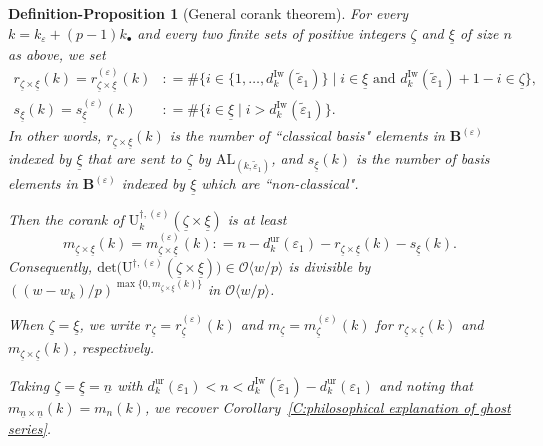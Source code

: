 \documentclass[12pt]{amsart}
\newtheorem{definition-proposition}[subsection]{Definition-Proposition}
\theoremstyle{definition}
\numberwithin{equation}{subsection}
\def\calO{\mathcal{O}}
\def\bfB{\mathbf{B}}
\def\rmU{\mathrm{U}}
\newcommand{\AL}{\mathrm{AL}}
\newcommand{\Iw}{\mathrm{Iw}}
\renewcommand{\det}{\mathrm{det}}
\newcommand{\ur}{\mathrm{ur}}
\begin{document}
\begin{definition-proposition}[General corank theorem]
\label{DP:general corank theorem}
For every ${k} = k_\varepsilon + (p-1)k_{\bullet}$ and every two finite sets of positive integers $\underline \zeta$ and $\underline \xi$  of size $n$ as above, 
we set
\begin{align*}
r_{\underline \zeta \times \underline \xi}(k) = r^{(\varepsilon)}_ {\underline \zeta \times\underline \xi}(k)&: = \#\big\{ i \in \{1, \dots, d_k^\Iw(\tilde \varepsilon_1)\} \; \big |\; i\in \underline \xi \textrm{ and }d_k^\Iw(\tilde \varepsilon_1)+1-i \in \underline \zeta
\big\},\\
s_{\underline \xi}(k)= s^{(\varepsilon)}_{\underline \xi}(k)&: = \#\big\{i\in \underline \xi \; \big |\; i >d_k^\Iw (\tilde \varepsilon_1)
\big\}.
\end{align*}
In other words, $r_{\underline \zeta \times \underline \xi}(k)$ is the number of ``classical basis" elements in $\bfB^{(\varepsilon)}$ indexed by $\underline \xi$ that are sent to $\underline \zeta$ by $\AL_{(k,\tilde \varepsilon_1)}$, and  $s_{\underline \xi}(k)$ is the number of basis elements in $\bfB^{(\varepsilon)}$ indexed by $\underline \xi$ which are ``non-classical".

Then the corank of $\rmU_k^{\dagger, (\varepsilon)}(\underline \zeta \times \underline \xi)$ is at least
\begin{equation}
\label{E:corank of U(xi)}
m_{\underline \zeta \times \underline \xi}(k)=m^{(\varepsilon)}_{\underline \zeta \times \underline \xi}(k): = 
n - d_k^\ur(\varepsilon_1) - r_{\underline \zeta \times \underline \xi}(k) - s_{\underline \xi}(k).
\end{equation}
Consequently, $\det \big(\rmU^{\dagger,(\varepsilon)}(\underline \zeta \times \underline \xi)\big) \in \calO\langle w/ p\rangle $ is divisible by $((w-w_k)/p)^{\max\{0, m_{\underline \zeta \times \underline \xi}(k)\}}$ in $\calO\langle w/p\rangle$.

When $\underline \zeta =\underline \xi$, we write $r_{\underline \zeta} = r^{(\varepsilon)}_{\underline \zeta}(k)$ and $m_{\underline \zeta} = m^{(\varepsilon)}_{\underline \zeta}(k)$ for $r_{\underline \zeta \times \underline \zeta}(k)$ and $m_{\underline \zeta\times \underline \zeta}(k)$, respectively.

Taking $\underline \zeta =\underline \xi = \underline n$ with $d_k^{\ur}(\varepsilon_1) < n< d_k^{\Iw}(\tilde \varepsilon_1) - d_k^\ur(\varepsilon_1)$ and noting that $m_{\underline n \times \underline n}(k) = m_n(k)$, we recover Corollary~\ref{C:philosophical explanation of ghost series}.
\end{definition-proposition}
\end{document}
